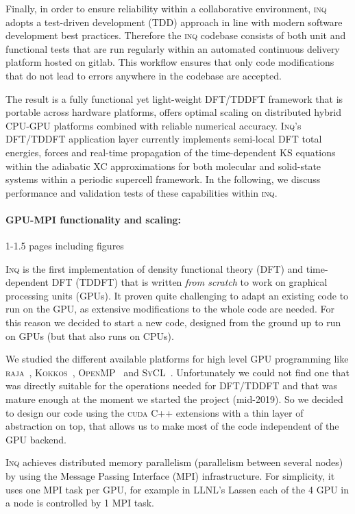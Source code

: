 Finally, in order to ensure reliability within a collaborative environment, \textsc{inq} adopts a test-driven development (TDD) approach in line with modern software development best practices. 
Therefore the \textsc{inq} codebase consists of both unit and functional tests that are run regularly within an automated continuous delivery platform hosted on gitlab. This workflow ensures that only code modifications that do not lead to errors anywhere in the codebase are accepted.

The result is a fully functional yet light-weight DFT/TDDFT framework that is portable across hardware platforms, offers optimal scaling on distributed hybrid CPU-GPU platforms combined with reliable numerical accuracy. 
\textsc{Inq}'s DFT/TDDFT application layer currently implements semi-local DFT total energies, forces and real-time propagation of the time-dependent KS equations within the adiabatic XC approximations for both molecular and solid-state systems within a periodic supercell framework. 
In the following, we discuss performance and validation tests of these capabilities within \textsc{inq}. 

\paragraph{GPU-MPI functionality and scaling:}
1-1.5 pages including figures

\textsc{Inq} is the first implementation of density functional theory (DFT) and time-dependent DFT (TDDFT) that is written \emph{from scratch} to work on graphical processing units (GPUs).
It proven quite challenging to adapt an existing code to run on the GPU, as extensive modifications to the whole code are needed.
For this reason we decided to start a new code, designed from the ground up to run on GPUs (but that also runs on CPUs). 

We studied the different available platforms for high level GPU programming like \textsc{raja}~\cite{Beckingsale2019}, \textsc{Kokkos}~\cite{CarterEdwards2014}, \textsc{OpenMP}~\cite{Lee2010} and \textsc{SyCL}~\cite{Alpay2020}.
Unfortunately we could not find one that was directly suitable for the operations needed for DFT/TDDFT and that was mature enough at the moment we started the project (mid-2019).
So we decided to design our code using the \textsc{cuda} C++ extensions with a thin layer of abstraction on top, that allows us to make most of the code independent of the GPU backend.

\textsc{Inq} achieves distributed memory parallelism (parallelism between several nodes) by using the Message Passing Interface (\textsc{MPI}) infrastructure.
For simplicity, it uses one MPI task per GPU, for example in LLNL's Lassen each of the 4 GPU in a node is controlled by 1 MPI task.

